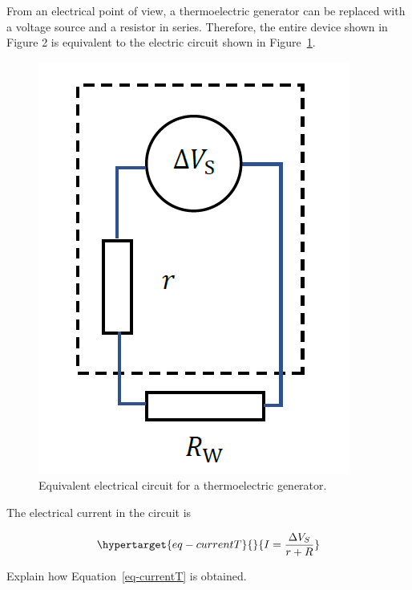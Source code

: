 \documentclass[
  letterpaper,
  DIV=11,
  numbers=noendperiod]{scrreprt}
\begin{document}
From an electrical point of view, a thermoelectric generator can be
replaced with a voltage source and a resistor in series. Therefore, the
entire device shown in Figure 2 is equivalent to the electric circuit
shown in Figure~\ref{fig-circuit}.

\begin{figure}

{\centering \includegraphics{./images/circuit.png}

}

\caption{\label{fig-circuit}Equivalent electrical circuit for a
thermoelectric generator.}

\end{figure}

The electrical current in the circuit is

\begin{equation}\protect\hypertarget{eq-currentT}{}{I = \frac{\Delta V_{S}}{r + R}}\label{eq-currentT}\end{equation}

\begin{tcolorbox}[enhanced jigsaw, toprule=.15mm, coltitle=black, bottomrule=.15mm, colbacktitle=quarto-callout-tip-color!10!white, opacitybacktitle=0.6, titlerule=0mm, colframe=quarto-callout-tip-color-frame, title=\textcolor{quarto-callout-tip-color}{\faLightbulb}\hspace{0.5em}{Question 3}, leftrule=.75mm, bottomtitle=1mm, breakable, opacityback=0, arc=.35mm, left=2mm, colback=white, rightrule=.15mm, toptitle=1mm]

Explain how Equation~\ref{eq-currentT} is obtained.

\end{tcolorbox}
\end{document}
